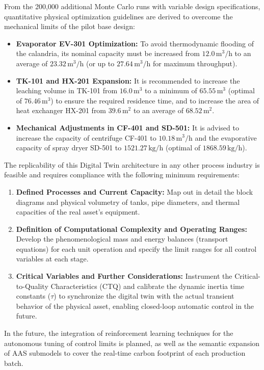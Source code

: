 \documentclass[10pt,letterpaper,twocolumn]{article}
\begin{document}
From the 200,000 additional Monte Carlo runs with variable design specifications, quantitative physical optimization guidelines are derived to overcome the mechanical limits of the pilot base design:
\begin{itemize}
    \item \textbf{Evaporator EV-301 Optimization:} To avoid thermodynamic flooding of the calandria, its nominal capacity must be increased from $12.0\,\text{m}^3/\text{h}$ to an average of $23.32\,\text{m}^3/\text{h}$ (or up to $27.64\,\text{m}^3/\text{h}$ for maximum throughput).
    \item \textbf{TK-101 and HX-201 Expansion:} It is recommended to increase the leaching volume in TK-101 from $16.0\,\text{m}^3$ to a minimum of $65.55\,\text{m}^3$ (optimal of $76.46\,\text{m}^3$) to ensure the required residence time, and to increase the area of heat exchanger HX-201 from $39.6\,\text{m}^2$ to an average of $68.52\,\text{m}^2$.
    \item \textbf{Mechanical Adjustments in CF-401 and SD-501:} It is advised to increase the capacity of centrifuge CF-401 to $10.18\,\text{m}^3/\text{h}$ and the evaporative capacity of spray dryer SD-501 to $1521.27\,\text{kg/h}$ (optimal of $1868.59\,\text{kg/h}$).
\end{itemize}

The replicability of this Digital Twin architecture in any other process industry is feasible and requires compliance with the following minimum requirements:
\begin{enumerate}
    \item \textbf{Defined Processes and Current Capacity:} Map out in detail the block diagrams and physical volumetry of tanks, pipe diameters, and thermal capacities of the real asset's equipment.
    \item \textbf{Definition of Computational Complexity and Operating Ranges:} Develop the phenomenological mass and energy balances (transport equations) for each unit operation and specify the limit ranges for all control variables at each stage.
    \item \textbf{Critical Variables and Further Considerations:} Instrument the Critical-to-Quality Characteristics (CTQ) and calibrate the dynamic inertia time constants ($\tau$) to synchronize the digital twin with the actual transient behavior of the physical asset, enabling closed-loop automatic control in the future.
\end{enumerate}

In the future, the integration of reinforcement learning techniques for the autonomous tuning of control limits is planned, as well as the semantic expansion of AAS submodels to cover the real-time carbon footprint of each production batch.
\end{document}
